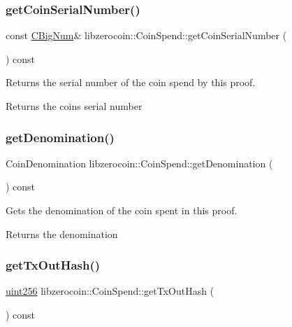 \subsubsection{\texorpdfstring{getCoinSerialNumber()}{getCoinSerialNumber()}}
{\footnotesize\ttfamily const \mbox{\hyperlink{class_c_big_num}{C\+Big\+Num}}\& libzerocoin\+::\+Coin\+Spend\+::get\+Coin\+Serial\+Number (\begin{DoxyParamCaption}{ }\end{DoxyParamCaption}) const\hspace{0.3cm}{\ttfamily [inline]}}

Returns the serial number of the coin spend by this proof.

\begin{DoxyReturn}{Returns}
the coin\textquotesingle{}s serial number 
\end{DoxyReturn}
\mbox{\label{classlibzerocoin_1_1_coin_spend_a1e36726a516e8b0a110fa40afbcc76bc}} 
\subsubsection{\texorpdfstring{getDenomination()}{getDenomination()}}
{\footnotesize\ttfamily Coin\+Denomination libzerocoin\+::\+Coin\+Spend\+::get\+Denomination (\begin{DoxyParamCaption}{ }\end{DoxyParamCaption}) const\hspace{0.3cm}{\ttfamily [inline]}}

Gets the denomination of the coin spent in this proof.

\begin{DoxyReturn}{Returns}
the denomination 
\end{DoxyReturn}
\mbox{\label{classlibzerocoin_1_1_coin_spend_a58d9ad8806aac3e37ff1110d95a12bbb}} 
\subsubsection{\texorpdfstring{getTxOutHash()}{getTxOutHash()}}
{\footnotesize\ttfamily \mbox{\hyperlink{classuint256}{uint256}} libzerocoin\+::\+Coin\+Spend\+::get\+Tx\+Out\+Hash (\begin{DoxyParamCaption}{ }\end{DoxyParamCaption}) const\hspace{0.3cm}{\ttfamily [inline]}}

